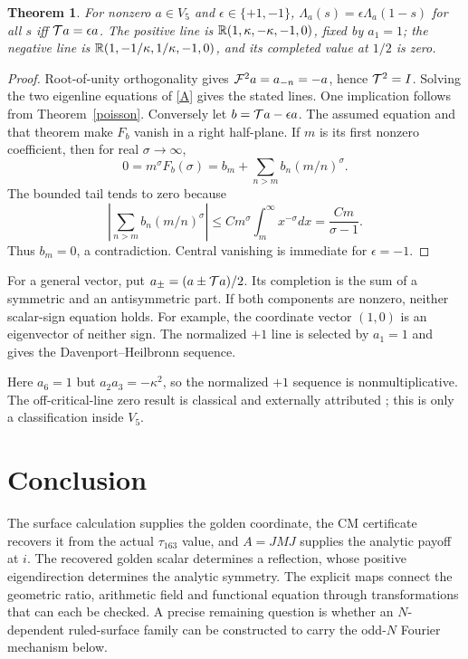 \documentclass[11pt]{article}
\newtheorem{theorem}{Theorem}[section]\newtheorem{proposition}[theorem]{Proposition}\newtheorem{corollary}[theorem]{Corollary}
\begin{document}
\begin{theorem}\label{classification}
For nonzero $a\in V_5$ and $\epsilon\in\{+1,-1\}$,
$\Lambda_a(s)=\epsilon\Lambda_a(1-s)$ for all $s$ iff $\mathcal T a=\epsilon a$.
The positive line is $\mathbb R(1,\kappa,-\kappa,-1,0)$, fixed by $a_1=1$;
the negative line is $\mathbb R(1,-1/\kappa,1/\kappa,-1,0)$, and its completed
value at $1/2$ is zero.
\end{theorem}
\begin{proof}
Root-of-unity orthogonality gives $\mathcal F^2a=a_{-n}=-a$, hence $\mathcal T^2=I$.
Solving the two eigenline equations of \eqref{A} gives the stated lines.
One implication follows from Theorem~\ref{poisson}.  Conversely let
$b=\mathcal T a-\epsilon a$.  The assumed equation and that theorem make
$F_b$ vanish in a right half-plane.  If $m$ is its first nonzero coefficient,
then for real $\sigma\to\infty$,
\[
0=m^\sigma F_b(\sigma)=b_m+\sum_{n>m}b_n(m/n)^\sigma.
\]
The bounded tail tends to zero because
\[
\left|\sum_{n>m}b_n(m/n)^\sigma\right|
\le C m^\sigma\int_m^\infty x^{-\sigma}dx
=\frac{Cm}{\sigma-1}.
\]
Thus $b_m=0$, a contradiction.
Central vanishing is immediate for $\epsilon=-1$.
\end{proof}
For a general vector, put $a_\pm=(a\pm\mathcal T a)/2$.  Its completion
is the sum of a symmetric and an antisymmetric part.  If both components
are nonzero, neither scalar-sign equation holds.  For example, the coordinate vector $(1,0)$
is an eigenvector of neither sign.  The normalized $+1$ line is selected by
$a_1=1$ and gives the Davenport--Heilbronn sequence.

Here $a_6=1$ but $a_2a_3=-\kappa^2$, so the normalized $+1$ sequence is
nonmultiplicative.  The off-critical-line zero result is classical and
externally attributed \cite{Balanzario}; this is only a classification inside
$V_5$.

\section{Conclusion}
The surface calculation supplies the golden coordinate, the CM certificate
recovers it from the actual $\tau_{163}$ value, and $A=JMJ$ supplies the
analytic payoff at $i$.  The recovered golden scalar determines a reflection,
whose positive eigendirection determines the analytic symmetry.  The explicit
maps connect the geometric ratio, arithmetic field and functional equation
through transformations that can each be checked.  A precise remaining question is whether an
$N$-dependent ruled-surface family can be constructed to carry the odd-$N$
Fourier mechanism below.
\end{document}
